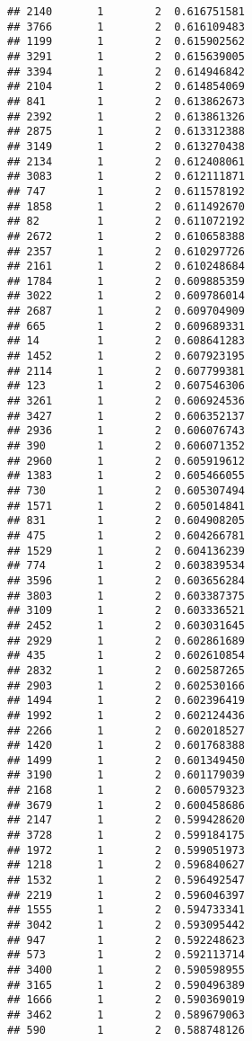 \documentclass[
]{article}
\begin{document}
\begin{verbatim}
## 2140       1        2  0.616751581
## 3766       1        2  0.616109483
## 1199       1        2  0.615902562
## 3291       1        2  0.615639005
## 3394       1        2  0.614946842
## 2104       1        2  0.614854069
## 841        1        2  0.613862673
## 2392       1        2  0.613861326
## 2875       1        2  0.613312388
## 3149       1        2  0.613270438
## 2134       1        2  0.612408061
## 3083       1        2  0.612111871
## 747        1        2  0.611578192
## 1858       1        2  0.611492670
## 82         1        2  0.611072192
## 2672       1        2  0.610658388
## 2357       1        2  0.610297726
## 2161       1        2  0.610248684
## 1784       1        2  0.609885359
## 3022       1        2  0.609786014
## 2687       1        2  0.609704909
## 665        1        2  0.609689331
## 14         1        2  0.608641283
## 1452       1        2  0.607923195
## 2114       1        2  0.607799381
## 123        1        2  0.607546306
## 3261       1        2  0.606924536
## 3427       1        2  0.606352137
## 2936       1        2  0.606076743
## 390        1        2  0.606071352
## 2960       1        2  0.605919612
## 1383       1        2  0.605466055
## 730        1        2  0.605307494
## 1571       1        2  0.605014841
## 831        1        2  0.604908205
## 475        1        2  0.604266781
## 1529       1        2  0.604136239
## 774        1        2  0.603839534
## 3596       1        2  0.603656284
## 3803       1        2  0.603387375
## 3109       1        2  0.603336521
## 2452       1        2  0.603031645
## 2929       1        2  0.602861689
## 435        1        2  0.602610854
## 2832       1        2  0.602587265
## 2903       1        2  0.602530166
## 1494       1        2  0.602396419
## 1992       1        2  0.602124436
## 2266       1        2  0.602018527
## 1420       1        2  0.601768388
## 1499       1        2  0.601349450
## 3190       1        2  0.601179039
## 2168       1        2  0.600579323
## 3679       1        2  0.600458686
## 2147       1        2  0.599428620
## 3728       1        2  0.599184175
## 1972       1        2  0.599051973
## 1218       1        2  0.596840627
## 1532       1        2  0.596492547
## 2219       1        2  0.596046397
## 1555       1        2  0.594733341
## 3042       1        2  0.593095442
## 947        1        2  0.592248623
## 573        1        2  0.592113714
## 3400       1        2  0.590598955
## 3165       1        2  0.590496389
## 1666       1        2  0.590369019
## 3462       1        2  0.589679063
## 590        1        2  0.588748126

\end{verbatim}
\end{document}
